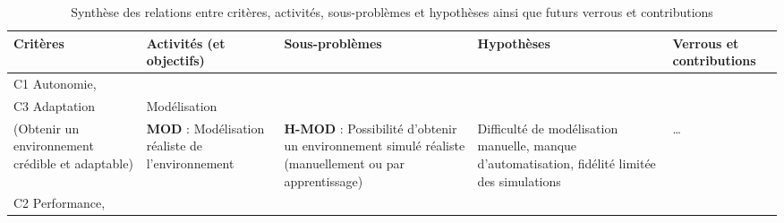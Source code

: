 \begin{table}[h!]
  \centering
  \caption{Synthèse des relations entre critères, activités, sous-problèmes et hypothèses ainsi que futurs verrous et contributions}
  \label{tab:processus-methode}
  \renewcommand{\arraystretch}{1.2}
  \scriptsize
  \begin{tabularx}{\textwidth}{
      >{\raggedright\arraybackslash\hsize=0.20\hsize}X
      >{\raggedright\arraybackslash\hsize=0.20\hsize}X
      >{\raggedright\arraybackslash\hsize=0.25\hsize}X
      >{\raggedright\arraybackslash\hsize=0.26\hsize}X
      >{\raggedright\arraybackslash\hsize=0.09\hsize}X
    }
    \toprule
    \textbf{Critères}                                                                                                     & \textbf{Activités (et objectifs)} & \textbf{Sous-problèmes} & \textbf{Hypothèses} & \textbf{Verrous et contributions} \\
    \midrule
    C1 Autonomie,                                                                                                                                                                                                                                 \\
    C3 Adaptation
                                                                                                                          &
    Modélisation                                                                                                                                                                                                                                  \\
    (Obtenir un environnement crédible et adaptable)
                                                                                                                          &
    \textbf{MOD} : Modélisation réaliste de l'environnement
                                                                                                                          &
    \vspace{-1.05cm}\textbf{H-MOD} : Possibilité d'obtenir un environnement simulé réaliste (manuellement ou par apprentissage)
                                                                                                                          &
    \vspace{-1.05cm}Difficulté de modélisation manuelle, manque d'automatisation, fidélité limitée des simulations        & \dots
    \\
    \addlinespace[2pt]
    \hdashline
    \addlinespace[2pt]
    C2 Performance,                                                                                                                                                                                                                               \\

\end{tabularx}
\end{table}
